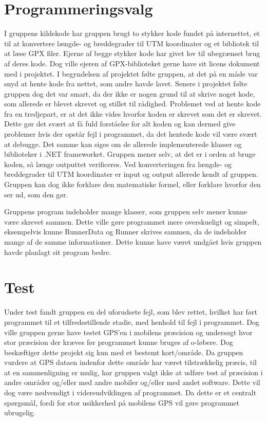 \section{Programmeringsvalg}
I gruppens kildekode har gruppen brugt to stykker kode fundet på internettet, et til at konvertere længde- og breddegrader til UTM koordinater og et bibliotek til at læse GPX filer. Ejerne af begge stykker kode har givet lov til ubegrænset brug af deres kode. Dog ville ejeren af GPX-biblioteket gerne have sit licens dokument med i projektet. I begyndelsen af projektet følte gruppen, at det på en måde var snyd at hente kode fra nettet, som andre havde lavet. Senere i projektet følte gruppen dog det var smart, da der ikke er nogen grund til at skrive noget kode, som allerede er blevet skrevet og stillet til rådighed. \newline
Problemet ved at hente kode fra en tredjepart, er at det ikke vides hvorfor koden er skrevet som det er skrevet. Dette gør det svært at få fuld forståelse for alt koden og kan dermed give problemer hvis der opstår fejl i programmet, da det hentede kode vil være svært at debugge. Det samme kan siges om de allerede implementerede klasser og biblioteker i .NET frameworket. Gruppen mener selv, at det er i orden at bruge koden, så længe outputtet verificeres.\newline
Ved konverteringen fra længde- og breddegrader til UTM koordinater er input og output allerede kendt af gruppen. Gruppen kan dog ikke forklare den matematiske formel, eller forklare hvorfor den ser ud, som den gør. 

Gruppens program indeholder mange klasser, som gruppen selv mener kunne være skrevet sammen. Dette ville gøre programmet mere overskueligt og simpelt, eksempelvis kunne RunnerData og Runner skrives sammen, da de indeholder mange af de samme informationer. Dette kunne have været undgået hvis gruppen havde planlagt sit program bedre.

\section{Test}
Under test fandt gruppen en del uforudsete fejl, som blev rettet, hvilket har ført programmet til et tilfredsstillende stadie, med henhold til fejl i programmet. Dog ville gruppen gerne have testet GPS’en i mobilens præcision og undersøgt hvor stor præcision der kræves før programmet kunne bruges af o-løbere. Dog beskæftiger dette projekt sig kun med et bestemt kort/område. Da gruppen vurdere at GPS dataen indenfor dette område har været tilstrækkelig præcis, til at en sammenligning er mulig, har gruppen valgt ikke at udføre test af præcision i andre områder og/eller med andre mobiler og/eller med andet software. Dette vil dog være nødvendigt i videreudviklingen af programmet. Da dette er et centralt spørgsmål, fordi for stor usikkerhed på mobilens GPS vil gøre programmet ubrugelig.
